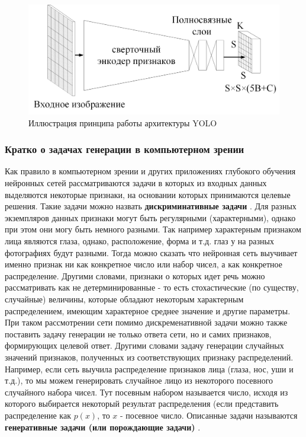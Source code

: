 \documentclass[12pt]{article}
\begin{document}
\begin{sloppypar}
    \begin{figure}[!h]
    	\begin{center}
    		\includegraphics[width=0.99\linewidth]{./figuresch1/YOLO.png}
    		\caption{Иллюстрация  принципа работы  архитектуры YOLO}	
    		\label{ch1:fig:R_CNN}
    	\end{center}
    \end{figure}
    
\subsubsection{Кратко о задачах генерации в компьютерном зрении}

Как правило в компьютерном зрении и других приложениях глубокого обучения нейронных сетей рассматриваются задачи в которых из входных данных выделяются некоторые признаки, на основании которых принимаются целевые решения. Такие задачи можно назвать \textbf{дискриминативные задачи} \cite{Nikolenko2017DL}.  Для разных экземпляров данных признаки могут быть регулярными (характерными), однако при этом они могу быть немного разными. Так например характерным признаком лица являются глаза, однако, расположение, форма и т.д. глаз у на разных фотографиях будут разными. Тогда можно сказать что нейронная сеть выучивает именно признак ни как конкретное число или набор чисел, а как конкретное распределение. Другими словами, признаки о которых идет речь можно рассматривать как не детерминированные - то есть стохастические (по существу, случайные) величины, которые обладают некоторым характерным распределением, имеющим характерное среднее значение и другие параметры.  При таком рассмотрении сети помимо дискременативной задачи можно также поставить задачу генерации не только ответа сети, но и самих признаков, формирующих целевой ответ. Другими словами задачу генерации случайных значений признаков, полученных из соответствующих признаку распределений. Например, если сеть выучила распределение признаков лица (глаза, нос, уши и т.д.), то мы можем генерировать случайное лицо из некоторого посевного случайного набора чисел. Тут посевным набором называется число, исходя из которого выбирается некоторый результат распределения (если представить распределение как $p(x)$, то $x$ - посевное число.  Описанные задачи называются \textbf{генеративные задачи (или порождающие задачи)} \cite{Nikolenko2017DL}. 


\end{sloppypar}
\end{document}
